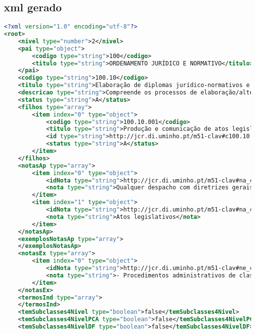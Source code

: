 \subsection{\acrshort{xml} gerado}
\begin{lstlisting}[language=xml, caption=\acrshort{xml} resultante da conversão do \acrshort{json} presente em~\ref{exem:json}]
<?xml version="1.0" encoding="utf-8"?>
<root>
    <nivel type="number">2</nivel>
    <pai type="object">
        <codigo type="string">100</codigo>
        <titulo type="string">ORDENAMENTO JURÍDICO E NORMATIVO</titulo>
    </pai>
    <codigo type="string">100.10</codigo>
    <titulo type="string">Elaboração de diplomas jurídico-normativos e de normas técnicas</titulo>
    <descricao type="string">Compreende os processos de elaboração/alteração de legislação, de regulamentos e de diretivas políticas ou operacionais portuguesas...</descricao>
    <status type="string">A</status>
    <filhos type="array">
        <item index="0" type="object">
            <codigo type="string">100.10.001</codigo>
            <titulo type="string">Produção e comunicação de atos legislativos</titulo>
            <id type="string">http://jcr.di.uminho.pt/m51-clav#c100.10.001</id>
            <status type="string">A</status>
        </item>
    </filhos>
    <notasAp type="array">
        <item index="0" type="object">
            <idNota type="string">http://jcr.di.uminho.pt/m51-clav#na_c100.10_MRIKl-RBu_2sz5u9FzPqH</idNota>
            <nota type="string">Qualquer despacho com diretrizes gerais e abstratas</nota>
        </item>
        <item index="1" type="object">
            <idNota type="string">http://jcr.di.uminho.pt/m51-clav#na_c100.10_2Dp209euc1AdQg7CUnKCN</idNota>
            <nota type="string">Atos legislativos</nota>
        </item>
    </notasAp>
    <exemplosNotasAp type="array">
    </exemplosNotasAp>
    <notasEx type="array">
        <item index="0" type="object">
            <idNota type="string">http://jcr.di.uminho.pt/m51-clav#ne_c100.10_bXM5qoj-hKZt6cijQktaj</idNota>
            <nota type="string">- Procedimentos administrativos de classificação do património cultural devem ser considerados em &quot;Reconhecimentos e permissões/ Classificação e declaração de interesse ou utilidade pública&quot; (450.20)</nota>
        </item>
    </notasEx>
    <termosInd type="array">
    </termosInd>
    <temSubclasses4Nivel type="boolean">false</temSubclasses4Nivel>
    <temSubclasses4NivelPCA type="boolean">false</temSubclasses4NivelPCA>
    <temSubclasses4NivelDF type="boolean">false</temSubclasses4NivelDF>

\end{lstlisting}
